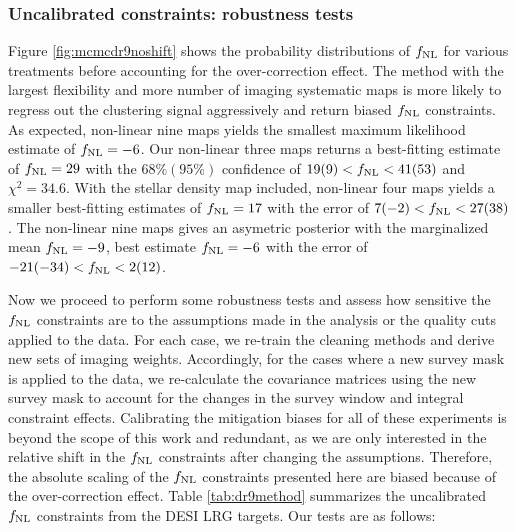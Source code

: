 \subsubsection{Uncalibrated constraints: robustness tests}
Figure \ref{fig:mcmcdr9noshift} shows the probability distributions of $f_{\rm NL}$ for various treatments before accounting for the over-correction effect. The method with the largest flexibility and more number of imaging systematic maps is more likely to regress out the clustering signal aggressively and return biased $f_{\rm NL}$ constraints. As expected, non-linear nine maps yields the smallest maximum likelihood estimate of $f_{\rm NL}=-6$. Our non-linear three maps returns a best-fitting estimate of $f_{\rm NL}=29$ with the $68\%(95\%)$ confidence of $19(9)<f_{\rm NL} <41(53)$ and $\chi^{2}=34.6$. With the stellar density map included, non-linear four maps yields a smaller best-fitting estimates of $f_{\rm NL}=17$ with the error of $7(-2)<f_{\rm NL}<27(38)$. The non-linear nine maps gives an asymetric posterior with the marginalized mean $f_{\rm NL}=-9$, best estimate $f_{\rm NL}=-6$ with the error of $-21(-34)<f_{\rm NL}<2(12)$.

Now we proceed to perform some robustness tests and assess how sensitive the $f_{\rm NL}$ constraints are to the assumptions made in the analysis or the quality cuts applied to the data. For each case, we re-train the cleaning methods and derive new sets of imaging weights. Accordingly, for the cases where a new survey mask is applied to the data, we re-calculate the covariance matrices using the new survey mask to account for the changes in the survey window and integral constraint effects. Calibrating the mitigation biases for all of these experiments is beyond the scope of this work and redundant, as we are only interested in the relative shift in the $f_{\rm NL}$ constraints after changing the assumptions. Therefore, the absolute scaling of the $f_{\rm NL}$ constraints presented here are biased because of the over-correction effect. Table \ref{tab:dr9method} summarizes the uncalibrated $f_{\rm NL}$ constraints from the DESI LRG targets. Our tests are as follows:%

